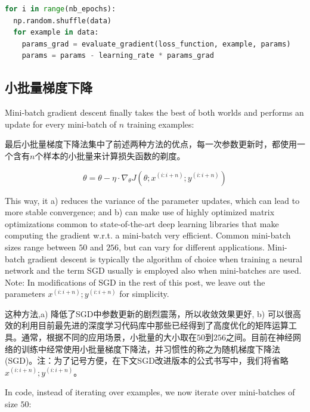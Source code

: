 \documentclass{article}
\begin{document}
\begin{lstlisting}[language=python]
for i in range(nb_epochs):
  np.random.shuffle(data)
  for example in data:
    params_grad = evaluate_gradient(loss_function, example, params)
    params = params - learning_rate * params_grad
\end{lstlisting}

\subsection{小批量梯度下降}

Mini-batch gradient descent finally takes the best of both worlds and performs an update for every mini-batch of $n$ training examples:

最后小批量梯度下降法集中了前述两种方法的优点，每一次参数更新时，都使用一个含有$n$个样本的小批量来计算损失函数的剃度。

\begin{equation}
\theta = \theta - \eta \cdot \nabla_\theta J( \theta; x^{(i:i+n)}; y^{(i:i+n)})
\end{equation}

This way, it a) reduces the variance of the parameter updates, which can lead to more stable convergence; and b) can make use of highly optimized matrix optimizations common to state-of-the-art deep learning libraries that make computing the gradient w.r.t. a mini-batch very efficient. Common mini-batch sizes range between $50$ and $256$, but can vary for different applications. Mini-batch gradient descent is typically the algorithm of choice when training a neural network and the term SGD usually is employed also when mini-batches are used. Note: In modifications of SGD in the rest of this post, we leave out the parameters $x^{(i:i+n)}; y^{(i:i+n)}$ for simplicity.

这种方法,a) 降低了SGD中参数更新的剧烈震荡，所以收敛效果更好, b) 可以很高效的利用目前最先进的深度学习代码库中那些已经得到了高度优化的矩阵运算工具。通常，根据不同的应用场景，小批量的大小取在$50$到$256$之间。目前在神经网络的训练中经常使用小批量梯度下降法，并习惯性的称之为随机梯度下降法(SGD)。注：为了记号方便，在下文SGD改进版本的公式书写中，我们将省略$x^{(i:i+n)}; y^{(i:i+n)}$。

In code, instead of iterating over examples, we now iterate over mini-batches of size $50$:
\end{document}
